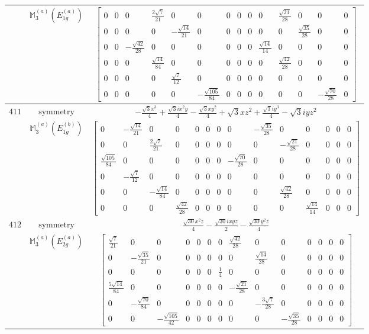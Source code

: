 \documentclass[fleqn,8pt,landscape]{jsarticle}
\begin{document}
\begin{longtable}{ccc}
$  $ & $ \mathbb{M}_{3}^{(a)}(E_{1g}^{(a)}) $ & $ \begin{bmatrix} 0 & 0 & 0 & \frac{2 \sqrt{7}}{21} & 0 & 0 & 0 & 0 & 0 & 0 & \frac{\sqrt{21}}{28} & 0 & 0 & 0 \\ 0 & 0 & 0 & 0 & - \frac{\sqrt{14}}{21} & 0 & 0 & 0 & 0 & 0 & 0 & \frac{\sqrt{35}}{28} & 0 & 0 \\ 0 & 0 & - \frac{\sqrt{42}}{28} & 0 & 0 & 0 & 0 & 0 & 0 & \frac{\sqrt{14}}{14} & 0 & 0 & 0 & 0 \\ 0 & 0 & 0 & \frac{\sqrt{14}}{84} & 0 & 0 & 0 & 0 & 0 & 0 & \frac{\sqrt{42}}{28} & 0 & 0 & 0 \\ 0 & 0 & 0 & 0 & \frac{\sqrt{7}}{12} & 0 & 0 & 0 & 0 & 0 & 0 & 0 & 0 & 0 \\ 0 & 0 & 0 & 0 & 0 & - \frac{\sqrt{105}}{84} & 0 & 0 & 0 & 0 & 0 & 0 & - \frac{\sqrt{70}}{28} & 0 \end{bmatrix} $ \\ \hline
$ 411 $ & $ \text{symmetry} $ & $ - \frac{\sqrt{3} x^{3}}{4} + \frac{\sqrt{3} i x^{2} y}{4} - \frac{\sqrt{3} x y^{2}}{4} + \sqrt{3} x z^{2} + \frac{\sqrt{3} i y^{3}}{4} - \sqrt{3} i y z^{2} $ \\
$  $ & $ \mathbb{M}_{3}^{(a)}(E_{1g}^{(b)}) $ & $ \begin{bmatrix} 0 & - \frac{\sqrt{14}}{21} & 0 & 0 & 0 & 0 & 0 & 0 & - \frac{\sqrt{35}}{28} & 0 & 0 & 0 & 0 & 0 \\ 0 & 0 & \frac{2 \sqrt{7}}{21} & 0 & 0 & 0 & 0 & 0 & 0 & - \frac{\sqrt{21}}{28} & 0 & 0 & 0 & 0 \\ \frac{\sqrt{105}}{84} & 0 & 0 & 0 & 0 & 0 & 0 & - \frac{\sqrt{70}}{28} & 0 & 0 & 0 & 0 & 0 & 0 \\ 0 & - \frac{\sqrt{7}}{12} & 0 & 0 & 0 & 0 & 0 & 0 & 0 & 0 & 0 & 0 & 0 & 0 \\ 0 & 0 & - \frac{\sqrt{14}}{84} & 0 & 0 & 0 & 0 & 0 & 0 & \frac{\sqrt{42}}{28} & 0 & 0 & 0 & 0 \\ 0 & 0 & 0 & \frac{\sqrt{42}}{28} & 0 & 0 & 0 & 0 & 0 & 0 & \frac{\sqrt{14}}{14} & 0 & 0 & 0 \end{bmatrix} $ \\ \hline
$ 412 $ & $ \text{symmetry} $ & $ \frac{\sqrt{30} x^{2} z}{4} - \frac{\sqrt{30} i x y z}{2} - \frac{\sqrt{30} y^{2} z}{4} $ \\
$  $ & $ \mathbb{M}_{3}^{(a)}(E_{2g}^{(a)}) $ & $ \begin{bmatrix} \frac{\sqrt{7}}{21} & 0 & 0 & 0 & 0 & 0 & 0 & \frac{\sqrt{42}}{28} & 0 & 0 & 0 & 0 & 0 & 0 \\ 0 & - \frac{\sqrt{35}}{21} & 0 & 0 & 0 & 0 & 0 & 0 & \frac{\sqrt{14}}{28} & 0 & 0 & 0 & 0 & 0 \\ 0 & 0 & 0 & 0 & 0 & 0 & \frac{1}{4} & 0 & 0 & 0 & 0 & 0 & 0 & 0 \\ \frac{5 \sqrt{14}}{84} & 0 & 0 & 0 & 0 & 0 & 0 & - \frac{\sqrt{21}}{28} & 0 & 0 & 0 & 0 & 0 & 0 \\ 0 & - \frac{\sqrt{70}}{84} & 0 & 0 & 0 & 0 & 0 & 0 & - \frac{3 \sqrt{7}}{28} & 0 & 0 & 0 & 0 & 0 \\ 0 & 0 & - \frac{\sqrt{105}}{42} & 0 & 0 & 0 & 0 & 0 & 0 & - \frac{\sqrt{35}}{28} & 0 & 0 & 0 & 0 \end{bmatrix} $ \\ \hline

\end{longtable}
\end{document}
